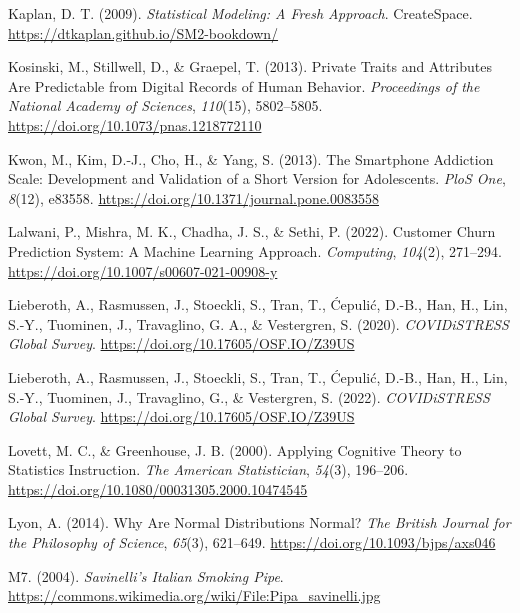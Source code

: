 \documentclass[
  letterpaper,
  oneside,
  open=any]{scrbook}
\newlength{\cslhangindent}
\newenvironment{CSLReferences}[2] %
 {\begin{list}{}{%
  \setlength{\itemindent}{0pt}
  \setlength{\leftmargin}{0pt}
  \setlength{\parsep}{0pt}
  \ifodd #1
   \setlength{\leftmargin}{\cslhangindent}
   \setlength{\itemindent}{-1\cslhangindent}
  \fi
  \setlength{\itemsep}{#2\baselineskip}}}
 {\end{list}}
\theoremstyle{definition}
\theoremstyle{definition}
\theoremstyle{definition}
\theoremstyle{remark}
\begin{document}
\begin{CSLReferences}{1}{0}
Kaplan, D. T. (2009). \emph{Statistical Modeling: A Fresh Approach}.
CreateSpace. \url{https://dtkaplan.github.io/SM2-bookdown/}

Kosinski, M., Stillwell, D., \& Graepel, T. (2013). Private Traits and
Attributes Are Predictable from Digital Records of Human Behavior.
\emph{Proceedings of the National Academy of Sciences}, \emph{110}(15),
5802--5805. \url{https://doi.org/10.1073/pnas.1218772110}

Kwon, M., Kim, D.-J., Cho, H., \& Yang, S. (2013). The Smartphone
Addiction Scale: Development and Validation of a Short Version for
Adolescents. \emph{PloS One}, \emph{8}(12), e83558.
\url{https://doi.org/10.1371/journal.pone.0083558}

Lalwani, P., Mishra, M. K., Chadha, J. S., \& Sethi, P. (2022). Customer
Churn Prediction System: A Machine Learning Approach. \emph{Computing},
\emph{104}(2), 271--294.
\url{https://doi.org/10.1007/s00607-021-00908-y}

Lieberoth, A., Rasmussen, J., Stoeckli, S., Tran, T., Ćepulić, D.-B.,
Han, H., Lin, S.-Y., Tuominen, J., Travaglino, G. A., \& Vestergren, S.
(2020). \emph{{COVIDiSTRESS} Global Survey}.
\url{https://doi.org/10.17605/OSF.IO/Z39US}

Lieberoth, A., Rasmussen, J., Stoeckli, S., Tran, T., Ćepulić, D.-B.,
Han, H., Lin, S.-Y., Tuominen, J., Travaglino, G., \& Vestergren, S.
(2022). \emph{{COVIDiSTRESS} Global Survey}.
\url{https://doi.org/10.17605/OSF.IO/Z39US}

Lovett, M. C., \& Greenhouse, J. B. (2000). Applying {Cognitive Theory}
to {Statistics Instruction}. \emph{The American Statistician},
\emph{54}(3), 196--206.
\url{https://doi.org/10.1080/00031305.2000.10474545}

Lyon, A. (2014). Why Are {Normal Distributions Normal}? \emph{The
British Journal for the Philosophy of Science}, \emph{65}(3), 621--649.
\url{https://doi.org/10.1093/bjps/axs046}

M7. (2004). \emph{Savinelli's {Italian} Smoking Pipe}.
\url{https://commons.wikimedia.org/wiki/File:Pipa_savinelli.jpg}


\end{CSLReferences}
\end{document}

